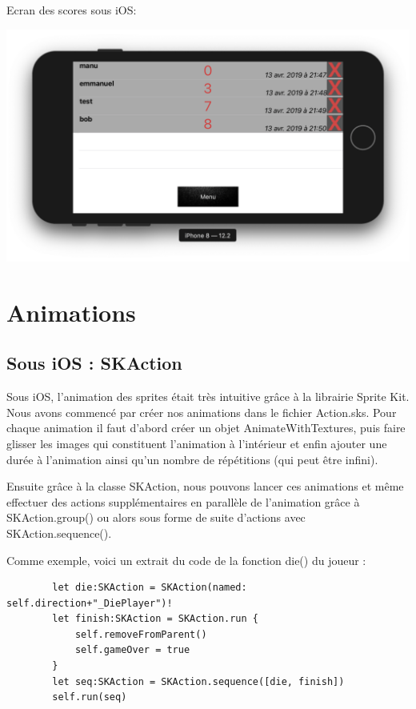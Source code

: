 \documentclass{article}
\begin{document}
Ecran des scores  sous iOS: 
\begin{center}
  \includegraphics[scale=0.3]{score.png}
\end{center}

\cleardoublepage

\section{Animations}

\subsection{Sous iOS : SKAction}

	Sous iOS, l'animation des sprites était très intuitive grâce à la librairie Sprite Kit.
Nous avons commencé par créer nos animations dans le fichier Action.sks. Pour chaque animation il faut d'abord créer un objet AnimateWithTextures, puis faire glisser les images qui constituent l'animation à l'intérieur et enfin ajouter une durée à l'animation ainsi qu'un nombre de répétitions (qui peut être infini).
    
    Ensuite grâce à la classe SKAction, nous pouvons lancer ces animations et même effectuer des actions supplémentaires en parallèle de l'animation grâce à SKAction.group() ou alors sous forme de suite d'actions avec SKAction.sequence().
    \bigskip
    
    Comme exemple, voici un extrait du code de la fonction die() du joueur :
    
    \begin{verbatim}
        let die:SKAction = SKAction(named: self.direction+"_DiePlayer")!
        let finish:SKAction = SKAction.run {
            self.removeFromParent()
            self.gameOver = true
        }
        let seq:SKAction = SKAction.sequence([die, finish])
        self.run(seq)
    \end{verbatim}
    
\end{document}
